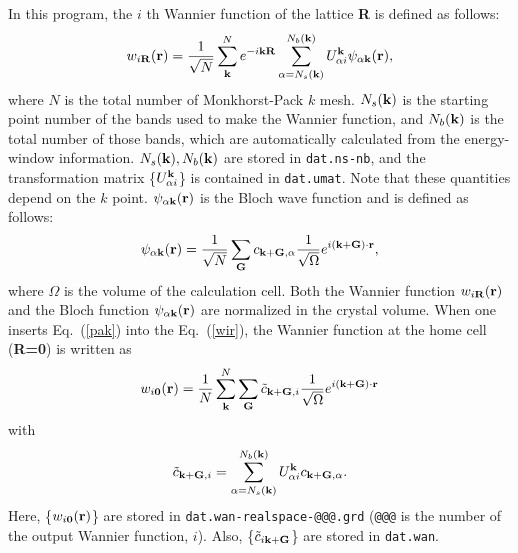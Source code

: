 \documentclass{article}
\begin{document}
In this program, the $i$ th Wannier function of the lattice {\bf R} is defined as follows:
\begin{eqnarray}
w_{i{\bf R}}({\bf r})=\frac{1}{\sqrt{N}}\sum_{{\bf k}}^{N}e^{-i{\bf kR}} \sum_{\alpha=N_s({\bf k})}^{N_b({\bf k})} U_{\alpha i}^{{\bf k}} \psi_{\alpha{\bf k}}({\bf r}), \label{wir}
\end{eqnarray} 
where $N$ is the total number of Monkhorst-Pack $k$ mesh. $N_s({\bf k})$ is the starting point number of the bands used to make the Wannier function, and $N_b({\bf k}) $ is the total number of those bands, which are automatically calculated from the energy-window information. $N_s({\bf k}), N_b({\bf k})$ are stored in \verb+dat.ns-nb+, and the transformation matrix \{$U_{\alpha i}^{{\bf k}}$\} is contained in \verb+dat.umat+. Note that these quantities depend on the $k$ point. $\psi_{\alpha {\bf k}}({\bf r})$ is the Bloch wave function and is defined as follows: 
\begin{eqnarray}
\psi_{\alpha{\bf k}}({\bf r})=\frac{1}{\sqrt{N}} \sum_{{\bf G}} c_{{\bf k+G},\alpha} \frac{1}{\sqrt{\Omega}} e^{i({\bf k+G})\cdot{\bf r}},  \label{pak} 
\end{eqnarray} 
where $\Omega$ is the volume of the calculation cell. Both the Wannier function $w_{i {\bf R}}({\bf r})$ and the Bloch function $\psi_{\alpha{\bf k}}({\bf r})$ are normalized in the crystal volume. When one inserts Eq.~(\ref{pak}) into the Eq.~(\ref{wir}), the Wannier function at the home cell ({\bf R=0}) is written as
\begin{eqnarray}
w_{i{\bf 0}}({\bf r})
=\frac{1}{N}
\sum_{{\bf k}}^{N}
\sum_{{\bf G}} 
\tilde{c}_{{\bf k+G},i}
\frac{1}{\sqrt{\Omega}}
e^{i({\bf k+G})\cdot{\bf r}} 
\end{eqnarray}
with 
\begin{eqnarray} 
\tilde{c}_{{\bf k+G},i}=\sum_{\alpha=N_s({\bf k})}^{N_b({\bf k})} U_{\alpha i}^{{\bf k}} c_{{\bf k+G},\alpha} \label{cikg}.  
\end{eqnarray}
Here, \{$w_{i {\bf 0}}({\bf r})$\} are stored in \verb+dat.wan-realspace-@@@.grd+ (\verb+@@@+ is the number of the output Wannier function, $i$). Also, \{$\tilde{c}_{i \bf k+G}$\} are stored in \verb+dat.wan+.
\end{document}
